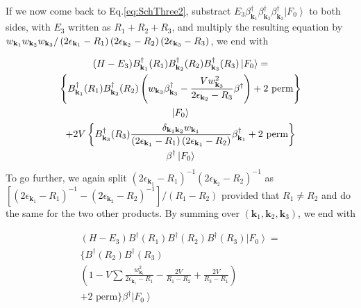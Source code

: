 \documentclass[aps,prb,superscriptaddress,twocolumn]{revtex4}
\begin{document}
If we now come back to Eq.\eqref{eq:SchThree2}, substract $E
_3\beta^{\dagger}_{\mathbf{k} _1}\beta^{\dagger}_{\mathbf{k}
_2}\beta^{\dagger}_{\mathbf{k} _3}\left|F_0\right>  $ to both sides, with $%
E _3$ written as $R_1+R_2+R_3$, and multiply the resulting equation
by $w_{\mathbf{k} _1}w_{\mathbf{k} _2}w_{\mathbf{k} _3}/\left(2\epsilon_{%
\mathbf{k} _1}-R_1\right) \left(2\epsilon_{\mathbf{k} _2}-R_2\right)
\left(2\epsilon_{\mathbf{k} _3}-R_3\right) $, we end with

\begin{multline}  \label{eq:SchThree3}
(H-E _3)B^{\dagger}_{\mathbf{k} _1}(R_1)B^{\dagger}_{\mathbf{k}
_2}(R_2)B^{\dagger}_{\mathbf{k} _3}(R_3)\left|F_0\right>  = \\
\left\{B^{\dagger}_{\mathbf{k} _1}(R_1)B^{\dagger}_{\mathbf{k}
_2}(R_2)\left(w_{\mathbf{k} _3}\beta^{\dagger}_{\mathbf{k} _3}-\frac{Vw_{%
\mathbf{k} _3}^2}{2\epsilon_{\mathbf{k} _2}-R_3}\beta^{\dagger}\right) +\text{%
2 perm}\right\}  \\
\left|F_0\right>   \\
+2V\left\{B^{\dagger}_{\mathbf{k} _3}(R_3)\frac{\delta_{\mathbf{k} _1\mathbf{%
k} _2}w_{\mathbf{k} _1}}{\left(2\epsilon_{\mathbf{k} _1}-R_1\right)
\left(2\epsilon_{\mathbf{k} _1}-R_2\right) }\beta^{\dagger}_{\mathbf{k} _1}+%
\text{2 perm}\right\}  \\
\beta^{\dagger}\left|F_0\right>  
\end{multline}
To go further, we again split $\left(2\epsilon_{\mathbf{k} _1}-R_1\right)
^{-1}\left(2\epsilon_{\mathbf{k} _2}-R_2\right) ^{-1}$ as $\left[%
\left(2\epsilon_{\mathbf{k} _1}-R_1\right) ^{-1}-\left(2\epsilon_{\mathbf{k}
_2}-R_2\right) ^{-1}\right] /\left(R_1-R_2\right) $ provided that $R_1\neq{}%
R_2$ and do the same for the two other products. By summing over $%
\left(\mathbf{k} _1,\mathbf{k} _2,\mathbf{k} _3\right) $, we end with

\begin{multline}  \label{eq:SchThree4}
(H-E _3)B^{\dagger}(R_1)B^{\dagger}(R_2)B^{\dagger}(R_3)\left|F_0%
\right>  = \\
\{B^{\dagger}(R_2)B^{\dagger}(R_3) \\
\left(1-V\sum\frac{w_{\mathbf{k} _1}^2}{2\epsilon_{\mathbf{k} _1}-R_1}-\frac{2V%
}{R_1-R_2}+\frac{2V}{R_3-R_1}\right)  \\
+\text{2 perm}\}\beta^{\dagger}\left|F_0\right>  
\end{multline}
\end{document}
